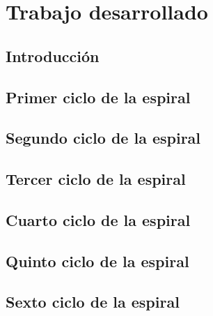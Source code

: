 \chapter{Trabajo desarrollado}

\section{Introducción}

\section{Primer ciclo de la espiral}


\section{Segundo ciclo de la espiral}


\section{Tercer ciclo de la espiral}


\section{Cuarto ciclo de la espiral}


\section{Quinto ciclo de la espiral}


\section{Sexto ciclo de la espiral}

